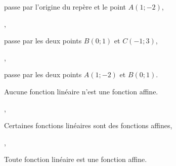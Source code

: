 \ifdefined\COMPLETE
\else
    
    
\fi

\ifdefined\CORRECTION
    \begin{alterqcm}[lq=10cm,correction]
\else
    \begin{alterqcm}[lq=10cm]
\fi


 
  

  {%
   {\begin{minipage}[t]{7cm} passe par l'origine du repère et le point $A(1;-2)$, \end{minipage}},
   {\begin{minipage}[t]{7cm}  passe par les deux points $B(0;1)$ et $C(-1;3)$,
    \end{minipage}},
   {\begin{minipage}[t]{7cm}  passe par les deux points $A(1;-2)$ et $B(0;1)$.
    \end{minipage}}
 }


 \AQquestion[br=3]{~}
  {%
   {\begin{minipage}[t]{7.5cm}  Aucune fonction linéaire n'est une fonction affine. \end{minipage}},
   {\begin{minipage}[t]{7cm}  Certaines fonctions linéaires sont des fonctions affines,
    \end{minipage}},
   {\begin{minipage}[t]{7cm}  Toute fonction linéaire est une fonction affine.
    \end{minipage}}
 }
 
 

\end{alterqcm}
\end{alterqcm}
